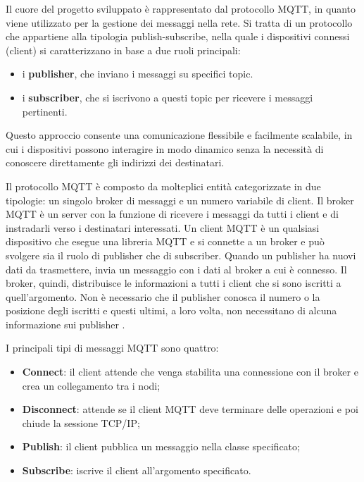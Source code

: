 \documentclass[12pt,a4paper,openright,twoside]{book}
\begin{document}
Il cuore del progetto sviluppato è rappresentato dal protocollo \acf{MQTT}, in quanto viene utilizzato per la gestione dei messaggi nella rete. 
Si tratta di un protocollo che appartiene alla tipologia publish-subscribe, nella quale i dispositivi connessi (client) si caratterizzano in base a due ruoli principali:
\begin{itemize}
    \item i \textbf{publisher}, che inviano i messaggi su specifici topic.
    \item i \textbf{subscriber}, che si iscrivono a questi topic per ricevere i messaggi pertinenti.
\end{itemize} 
Questo approccio consente una comunicazione flessibile e facilmente scalabile, in cui i dispositivi possono interagire in modo dinamico senza la necessità di conoscere 
direttamente gli indirizzi dei destinatari.

Il protocollo \ac{MQTT} è composto da molteplici entità categorizzate in due tipologie: un singolo broker di messaggi e un numero variabile di client. Il broker \ac{MQTT} è un server 
con la funzione di ricevere i messaggi da tutti i client e di instradarli verso i destinatari interessati. Un client \ac{MQTT} è un qualsiasi dispositivo che esegue una libreria 
\ac{MQTT} e si connette a un broker e può svolgere sia il ruolo di publisher che di subscriber. Quando un publisher ha nuovi dati da trasmettere, 
invia un messaggio con i dati al broker a cui è connesso. Il broker, quindi, distribuisce le informazioni a tutti i client che si sono iscritti a quell’argomento. 
Non è necessario che il publisher conosca il numero o la posizione degli iscritti e questi ultimi, a loro volta, non necessitano di alcuna informazione sui publisher \cite{mqtt-doc}.

I principali tipi di messaggi \ac{MQTT} sono quattro:
\begin{itemize}
    \item \textbf{Connect}: il client attende che venga stabilita una connessione con il broker e crea un collegamento tra i nodi;
    \item \textbf{Disconnect}: attende se il client \ac{MQTT} deve terminare delle operazioni e poi chiude la sessione TCP/IP;
    \item \textbf{Publish}: il client pubblica un messaggio nella classe specificato;
    \item \textbf{Subscribe}: iscrive il client all’argomento specificato.
\end{itemize}
\end{document}
